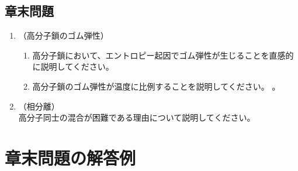 \documentclass[uplatex,dvipdfmx,a4paper,11pt, titlepage]{jsarticle}
\begin{document}
\subsection{章末問題}

	\begin{enumerate}
	\item
	（高分子鎖のゴム弾性）\\
		\vspace{-5mm}
		\begin{enumerate}
		\item
		\label{it:5-1}
		高分子鎖において、エントロピー起因でゴム弾性が生じることを直感的に説明してください。

		\item
		\label{it:5-2}
		高分子鎖のゴム弾性が温度に比例することを説明してください。
。
		\end{enumerate}
	\item
	（相分離）\\
	\label{it:5-3}
	高分子同士の混合が困難である理由について説明してください。

	\end{enumerate}

\newpage

\section{章末問題の解答例}
\end{document}

